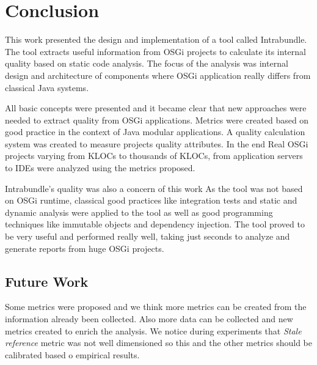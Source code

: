 \chapter{Conclusion}
This work presented the design and implementation of a tool called Intrabundle. The tool extracts useful information from OSGi projects to calculate its internal quality based on static code analysis. The focus of the analysis was internal design and architecture of components where OSGi application really differs from classical Java systems. 

All basic concepts were presented and it became clear that new approaches were needed to extract quality from OSGi applications. Metrics were created based on good practice in the context of Java modular applications. A quality calculation system was created to measure projects quality attributes. In the end Real OSGi projects varying from KLOCs to thousands of KLOCs, from application servers to IDEs were analyzed using the metrics proposed.

Intrabundle's quality was also a concern of this work As the tool was not based on OSGi runtime, classical good practices like integration tests and static and dynamic analysis were applied to the tool as well as good programming techniques like immutable objects and dependency injection.      
The tool proved to be very useful and performed really well, taking just seconds to analyze and generate reports from huge OSGi projects.



\section{Future Work}
Some metrics were proposed and we think more metrics can be created from the information already been collected. Also more data can be collected and new metrics created to enrich the analysis. We notice during experiments that \emph{Stale reference} metric was not well dimensioned so this and the other metrics should be calibrated based o empirical results.

